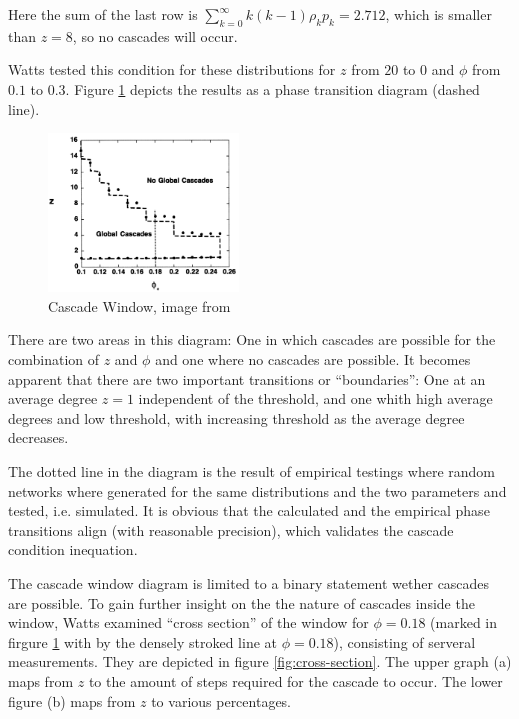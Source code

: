 \documentclass{sig-alternate-05-2015}
\begin{document}
Here the sum of the last row is $\sum_{k=0}^\infty k (k-1) \rho_k p_k = 2.712$, which is smaller than $z = 8$, so no cascades will occur.

Watts tested this condition for these distributions for $z$ from $20$ to $0$ and $\phi$ from $0.1$ to $0.3$. Figure \ref{fig:cascade-window} depicts the results as a phase transition diagram (dashed line).

\begin{figure}[h!]
  \centering
  \includegraphics[width=0.45\textwidth]{img/cascade-regimes-with-cross-section.png}
  \caption{Cascade Window, image from \cite{simplemodel}}
  \label{fig:cascade-window}
\end{figure}

There are two areas in this diagram: One in which cascades are possible for the combination of $z$ and $\phi$ and one where no cascades are possible. It becomes apparent that there are two important transitions or ``boundaries'': One at an average degree $z = 1$ independent of the threshold, and one whith high average degrees and low threshold, with increasing threshold as the average degree decreases.

The dotted line in the diagram is the result of empirical testings where random networks where generated for the same distributions and the two parameters and tested, i.e. simulated. It is obvious that the calculated and the empirical phase transitions align (with reasonable precision), which validates the cascade condition inequation.

The cascade window diagram is limited to a binary statement wether cascades are possible. To gain further insight on the the nature of cascades inside the window, Watts examined ``cross section'' of the window for $\phi=0.18$ (marked in firgure \ref{fig:cascade-window} with by the densely stroked line at $\phi=0.18$), consisting of serveral measurements. They are depicted in figure \ref{fig:cross-section}. The upper graph (a) maps from $z$ to the amount of steps required for the cascade to occur. The lower figure (b) maps from $z$ to various percentages.
\end{document}
